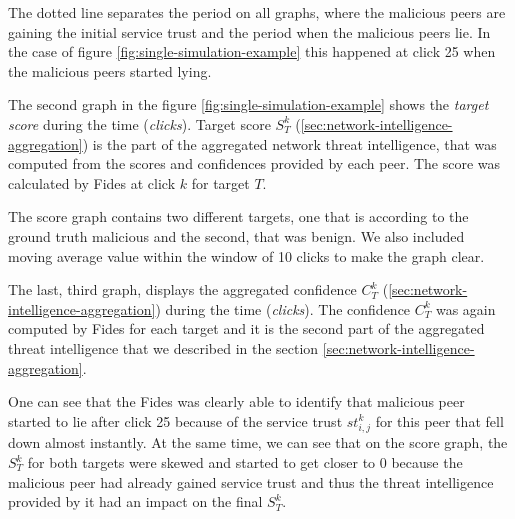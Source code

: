 The dotted line separates the period on all graphs, where the malicious peers are gaining the initial service trust and the period when the malicious peers lie.
In the case of figure \ref{fig:single-simulation-example} this happened at click 25 when the malicious peers started lying.

The second graph in the figure \ref{fig:single-simulation-example} shows the \textit{target score} during the time (\textit{clicks}).
Target score $S^{k}_{T}$ (\ref{sec:network-intelligence-aggregation}) is the part of the aggregated network threat intelligence, that was computed from the scores and confidences provided by each peer.
The score was calculated by Fides at click $k$ for target $T$.

The score graph contains two different targets, one that is according to the ground truth malicious and the second, that was benign.
We also included moving average value within the window of 10 clicks to make the graph clear.

The last, third graph, displays the aggregated confidence $C^{k}_{T}$ (\ref{sec:network-intelligence-aggregation}) during the time (\textit{clicks}).
The confidence $C^{k}_{T}$ was again computed by Fides for each target and it is the second part of the aggregated threat intelligence that we described in the section \ref{sec:network-intelligence-aggregation}.

One can see that the Fides was clearly able to identify that malicious peer started to lie after click 25 because of the service trust $st^{k}_{i,j}$ for this peer that fell down almost instantly.
At the same time, we can see that on the score graph, the $S^{k}_{T}$ for both targets were skewed and started to get closer to $0$ because the malicious peer had already gained service trust and thus the threat intelligence provided by it had an impact on the final $S^{k}_{T}$.
